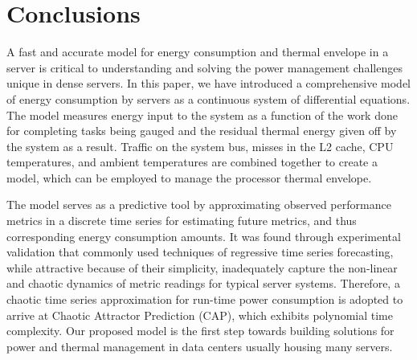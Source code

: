 \chapter{Conclusions}
\label{chp:conclusions}
A fast and accurate model for energy consumption and thermal envelope in
a server is critical to understanding and solving the power management
challenges unique in dense servers.  In this paper, we have introduced a
comprehensive model of energy consumption by servers as a continuous
system of differential equations.  The model measures energy input to
the system as a function of the work done for completing tasks being
gauged and the residual thermal energy given off by the system as a
result.  Traffic on the system bus, misses in the L2 cache, CPU
temperatures, and ambient temperatures are combined together to create a
model, which can be employed to manage the processor thermal envelope.

The model serves as a predictive tool by approximating observed
performance metrics in a discrete time series for estimating future
metrics, and thus corresponding energy consumption amounts.  It was
found through experimental validation that commonly used techniques of
regressive time series forecasting, while attractive because of their
simplicity, inadequately capture the non-linear and chaotic dynamics of
metric readings for typical server systems.  Therefore, a chaotic time
series approximation for run-time power consumption is adopted to arrive
at Chaotic Attractor Prediction (CAP), which exhibits polynomial time
complexity.  Our proposed model is the first step towards building
solutions for power and thermal management in data centers usually
housing many servers.
